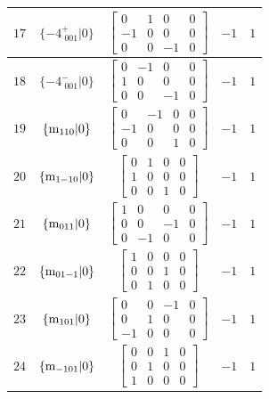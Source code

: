 \documentclass[fleqn,8pt]{jsarticle}
\begin{document}
\begin{longtable}{ccccc}
$ 17 $ & $ \{-4^{+}_{\,\,001}|0\} $ & $ \begin{bmatrix} 0 & 1 & 0 & 0 \\ -1 & 0 & 0 & 0 \\ 0 & 0 & -1 & 0 \end{bmatrix} $ & $ -1 $ & $ 1 $ \\ \hline
$ 18 $ & $ \{-4^{-}_{\,\,001}|0\} $ & $ \begin{bmatrix} 0 & -1 & 0 & 0 \\ 1 & 0 & 0 & 0 \\ 0 & 0 & -1 & 0 \end{bmatrix} $ & $ -1 $ & $ 1 $ \\ \hline
$ 19 $ & $ \{{\rm m}_{110}|0\} $ & $ \begin{bmatrix} 0 & -1 & 0 & 0 \\ -1 & 0 & 0 & 0 \\ 0 & 0 & 1 & 0 \end{bmatrix} $ & $ -1 $ & $ 1 $ \\ \hline
$ 20 $ & $ \{{\rm m}_{1-10}|0\} $ & $ \begin{bmatrix} 0 & 1 & 0 & 0 \\ 1 & 0 & 0 & 0 \\ 0 & 0 & 1 & 0 \end{bmatrix} $ & $ -1 $ & $ 1 $ \\ \hline
$ 21 $ & $ \{{\rm m}_{011}|0\} $ & $ \begin{bmatrix} 1 & 0 & 0 & 0 \\ 0 & 0 & -1 & 0 \\ 0 & -1 & 0 & 0 \end{bmatrix} $ & $ -1 $ & $ 1 $ \\ \hline
$ 22 $ & $ \{{\rm m}_{01-1}|0\} $ & $ \begin{bmatrix} 1 & 0 & 0 & 0 \\ 0 & 0 & 1 & 0 \\ 0 & 1 & 0 & 0 \end{bmatrix} $ & $ -1 $ & $ 1 $ \\ \hline
$ 23 $ & $ \{{\rm m}_{101}|0\} $ & $ \begin{bmatrix} 0 & 0 & -1 & 0 \\ 0 & 1 & 0 & 0 \\ -1 & 0 & 0 & 0 \end{bmatrix} $ & $ -1 $ & $ 1 $ \\ \hline
$ 24 $ & $ \{{\rm m}_{-101}|0\} $ & $ \begin{bmatrix} 0 & 0 & 1 & 0 \\ 0 & 1 & 0 & 0 \\ 1 & 0 & 0 & 0 \end{bmatrix} $ & $ -1 $ & $ 1 $ \\ \hline

\end{longtable}
\end{document}
